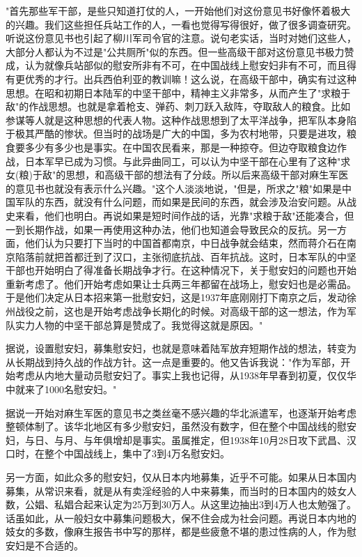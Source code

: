 \documentclass[12pt,UTF8]{ctexbook}
\begin{document}
"首先那些军干部，是些只知道打仗的人，一开始他们对这份意见书好像怀着极大的兴趣。我们这些担任兵站工作的人，一看也觉得写得很好，做了很多调查研究。听说这份意见书也引起了柳川军司令官的注意。说句老实话，当时对她们这些人，大部分人都认为不过是"公共厕所"似的东西。但一些高级干部对这份意见书极力赞成，认为就像兵站部似的慰安所非有不可，在中国战线上慰安妇非有不可，而且得有更优秀的才行。出兵西伯利亚的教训嘛！这么说，在高级干部中，确实有过这种思想。在昭和初期日本陆军的中坚干部中，精神主义非常多，从而产生了"求粮于敌"的作战思想。也就是拿着枪支、弹药、刺刀跃入敌阵，夺取敌人的粮食。比如参谋等人就是这种思想的代表人物。这种作战思想到了太平洋战争，把军队本身陷于极其严酷的惨状。但当时的战场是广大的中国，多为农村地带，只要是进攻，粮食要多少有多少也是事实。在中国农民看来，那是一种掠夺。但边夺取粮食边作战，日本军早已成为习惯。与此异曲同工，可以认为中坚干部在心里有了这种"求女(粮)于敌"的思想，和高级干部的想法有了分歧。所以后来高级干部对麻生军医的意见书也就没有表示什么兴趣。"这个人淡淡地说，"但是，所求之"粮"如果是中国军队的东西，就没有什么问题，而如果是民间的东西，就会涉及治安问题。从战史来看，他们也明白。再说如果是短时间作战的话，光靠"求粮于敌"还能凑合，但一到长期作战，如果一再使用这种办法，他们也知道会导致民众的反抗。另一方面，他们认为只要打下当时的中国首都南京，中日战争就会结束，然而蒋介石在南京陷落前就把首都迁到了汉口，主张彻底抗战、百年抗战。这时，日本军队的中坚干部也开始明白了得准备长期战争才行。在这种情况下，关于慰安妇的问题也开始重新考虑了。他们开始考虑如果让士兵两三年都留在战场上，慰安妇也是必需品。于是他们决定从日本招来第一批慰安妇，这是1937年底刚刚打下南京之后，发动徐州战役之前，这也是开始考虑战争长期化的时候。对高级干部的这一想法，作为军队实力人物的中坚干部总算是赞成了。我觉得这就是原因。"



据说，设置慰安妇，募集慰安妇，也就是意味着陆军放弃短期作战的想法，转变为从长期战到持久战的作战方针。这一点是重要的。他又告诉我说："作为军部，开始考虑从内地大量动员慰安妇了。事实上我也记得，从1938年早春到初夏，仅仅华中就来了1000名慰安妇。"



据说一开始对麻生军医的意见书之类丝毫不感兴趣的华北派遣军，也逐渐开始考虑整顿体制了。该华北地区有多少慰安妇，虽然没有数字，但在整个中国战线的慰安妇，与日、与月、与年俱增却是事实。虽属推定，但1938年10月28日攻下武昌、汉口时，在整个中国战线上，集中了3到4万名慰安妇。



另一方面，如此众多的慰安妇，仅从日本内地募集，近乎不可能。如果从日本国内募集，从常识来看，就是从有卖淫经验的人中来募集，而当时的日本国内的妓女人数，公娼、私娼合起来认定为25万到30万人。从这里边抽出3到4万人也太勉强了。话虽如此，从一般妇女中募集问题极大，保不住会成为社会问题。再说日本内地的妓女的多数，像麻生报告书中写的那样，都是些疲惫不堪的患过性病的人，作为慰安妇是不合适的。
\end{document}
